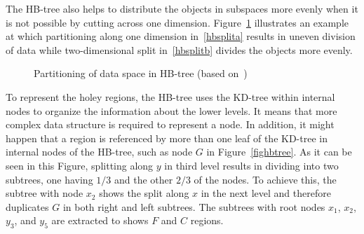 \documentclass[a4paper,12pt]{article}
\begin{document}
The HB-tree also helps to distribute the objects in subspaces more evenly when it is not possible by cutting across one dimension. Figure~\ref{hbtree} illustrates an example at which partitioning along one dimension in~\ref{hbsplita} results in uneven division of data while two-dimensional split in~\ref{hbsplitb} divides the objects more evenly.

\begin{figure}
\centering
{}
\centering
{}
\caption{Partitioning of data space in HB-tree (based on~\cite{tree-basedindexes})}
\label{hbtree}
\end{figure}

To represent the holey regions, the HB-tree uses the KD-tree within internal nodes to organize the information about the lower levels. It means that more complex data structure is required to represent a node. In addition, it might happen that a region is referenced by more than one leaf of the KD-tree in internal nodes of the HB-tree, such as node $G$ in Figure~\ref{fighbtree}. As it can be seen in this Figure, splitting along $y$ in third level results in dividing into two subtrees, one having $1/3$ and the other $2/3$ of the nodes. To achieve this, the subtree with node $x_2$ shows the split along $x$ in the next level and therefore duplicates $G$ in both right and left subtrees. The subtrees with root nodes $x_1$, $x_2$, $y_3$, and $y_5$ are extracted to shows $F$ and $C$ regions.
\end{document}
